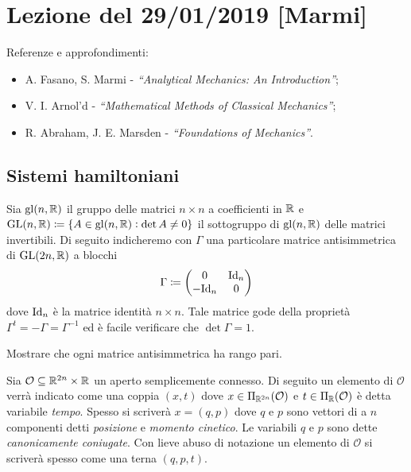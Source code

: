 \section{Lezione del 29/01/2019 [Marmi]}
Referenze e approfondimenti:
\begin{itemize}
    \item A. Fasano, S. Marmi - \emph{``Analytical Mechanics: An Introduction''};
    \item V. I. Arnol'd - \emph{``Mathematical Methods of Classical Mechanics''};
    \item R. Abraham, J. E. Marsden - \emph{``Foundations of Mechanics''}.
\end{itemize}

\subsection{Sistemi hamiltoniani}
Sia $ \mathrm{gl}(n, \mathbb{R}) $ il gruppo delle matrici $ n \times n $ a coefficienti in $ \mathbb{R} $ e $ {\mathrm{GL}(n, \mathbb{R}) \coloneqq \{A \in \mathrm{gl}(n, \mathbb{R}) : \det{A} \neq 0\}} $ il sottogruppo di $ \mathrm{gl}(n, \mathbb{R}) $ delle matrici invertibili. Di seguito indicheremo con $ \Gamma $ una particolare matrice antisimmetrica di $ \mathrm{GL}(2n, \mathbb{R}) $ a blocchi
\begin{equation}
    \Gamma \coloneqq
    \begin{pmatrix}
        0 & \mathrm{Id}_{n} \\
        -\mathrm{Id}_{n} & 0 \\
    \end{pmatrix}
\end{equation}
dove $ \mathrm{Id}_n $ è la matrice identità $ n \times n $. Tale matrice gode della proprietà $ \Gamma^t = -\Gamma = \Gamma^{-1} $ ed è facile verificare che $ \det{\Gamma} = 1 $. \\

\begin{exercise}
    Mostrare che ogni matrice antisimmetrica ha rango pari.
\end{exercise}

Sia $ \mathcal{O} \subseteq \mathbb{R}^{2n} \times \mathbb{R} $ un aperto semplicemente connesso. Di seguito un elemento di $ \mathcal{O} $ verrà indicato come una coppia $ (x, t) $ dove $ x \in \Pi_{\mathbb{R}^{2n}}(\mathcal{O}) $ e $ t \in \Pi_{\mathbb{R}}(\mathcal{O}) $ è detta variabile \emph{tempo}. Spesso si scriverà $ x = (q, p) $ dove $ q $ e $ p $ sono vettori di a $ n $ componenti detti \emph{posizione} e \emph{momento cinetico}. Le variabili $ q $ e $ p $ sono dette \emph{canonicamente coniugate}. Con lieve abuso di notazione un elemento di $ \mathcal{O} $ si scriverà spesso come una terna $ (q, p, t) $. \\

